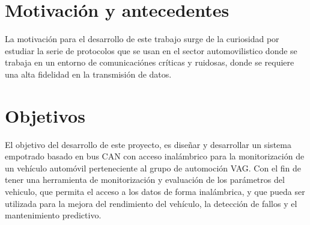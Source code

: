 \section{Motivación y antecedentes}

La motivación para el desarrollo de este trabajo surge de la curiosidad por estudiar la serie de protocolos que se usan en el sector automovilistico donde se trabaja en un entorno de comunicaciónes críticas y ruidosas, donde se requiere una alta fidelidad en la transmisión de datos.\\

\section{Objetivos}

El objetivo del desarrollo de este proyecto, es diseñar y desarrollar un sistema empotrado basado en bus CAN con acceso inalámbrico para la monitorización de un vehículo automóvil perteneciente al grupo de automoción VAG. Con el fin de tener una herramienta de monitorización y evaluación de los parámetros del vehiculo, que permita el acceso a los datos de forma inalámbrica, y que pueda ser utilizada para la mejora del rendimiento del vehículo, la detección de fallos y el mantenimiento predictivo.
